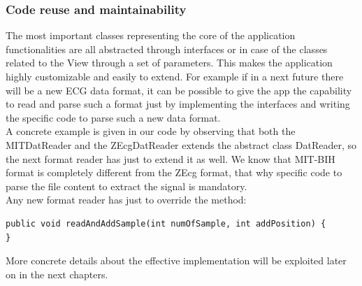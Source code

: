 \subsubsection{Code reuse and maintainability}
The most important classes representing the core of the application functionalities are all abstracted through interfaces or in case of the classes related to the View through a set of parameters. This makes the application highly customizable and easily to extend. For example if in a next future there will be a new ECG data format, it can be possible to give the app the capability to read and parse such a format just by implementing the interfaces and writing the specific code to parse such a new data format.\\
A concrete example is given in our code by observing that both the MITDatReader and the ZEcgDatReader extends the abstract class DatReader, so the next format reader has just to extend it as well. We know that MIT-BIH format is completely different from the ZEcg format, that why specific code to parse the file content to extract the signal is mandatory.\\
Any new format reader has just to override the method:
\begin{lstlisting}
public void readAndAddSample(int numOfSample, int addPosition) {
}
\end{lstlisting}
More concrete details about the effective implementation will be exploited later on in the next chapters.
